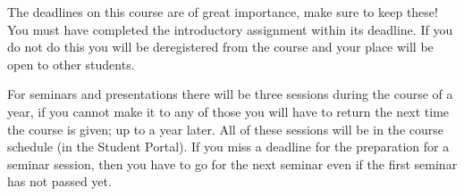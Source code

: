 
The deadlines on this course are of great importance, make sure to keep these!
You must have completed the introductory assignment within its deadline.
If you do not do this you will be deregistered from the course and your place 
will be open to other students.

For seminars and presentations there will be three sessions during the course 
of a year, if you cannot make it to any of those you will have to return the 
next time the course is given; \ie up to a year later.
All of these sessions will be in the course schedule (in the Student Portal).
If you miss a deadline for the preparation for a seminar session, then you have 
to go for the next seminar even if the first seminar has not passed yet.

